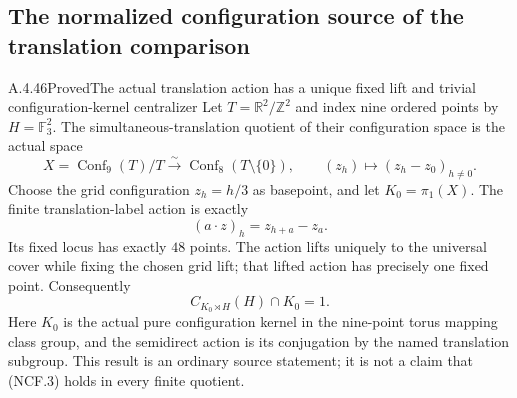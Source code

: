 \subsection{The normalized configuration source of the translation comparison}

\begin{result}{A.4.46}{Proved}{The actual translation action has a unique fixed lift and trivial configuration-kernel centralizer}
Let $T=\mathbb R^2/\mathbb Z^2$ and index nine ordered
points by $H=\mathbb F_3^2$. The simultaneous-translation
quotient of their configuration space is the actual space
\[
 X=\operatorname{Conf}_9(T)/T
  \xrightarrow{\sim}\operatorname{Conf}_8(T\setminus\{0\}),
 \qquad(z_h)\longmapsto(z_h-z_0)_{h\ne0}.
                                                               \tag{NCF.1}
\]
Choose the grid configuration $z_h=h/3$ as basepoint,
and let $K_0=\pi_1(X)$.
The finite translation-label action is exactly
\[
                    (a\cdot z)_h=z_{h+a}-z_a.
                                                               \tag{NCF.2}
\]
Its fixed locus has exactly $48$ points. The action
lifts uniquely to the universal cover while fixing
the chosen grid lift; that lifted action has precisely
one fixed point. Consequently
\[
                         C_{K_0\rtimes H}(H)\cap K_0=1.
                                                               \tag{NCF.3}
\]
Here $K_0$ is the actual pure configuration kernel
in the nine-point torus mapping class group, and
the semidirect action is its conjugation by the
named translation subgroup. This result is an
ordinary source statement; it is not a claim that
(NCF.3) holds in every finite quotient.
\end{result}

